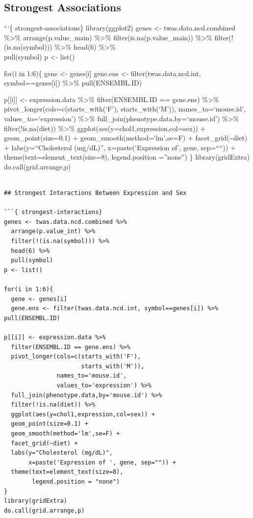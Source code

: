 \documentclass[
]{article}
\begin{document}
\hypertarget{strongest-associations}{%
\subsection{Strongest Associations}\label{strongest-associations}}

```\{ strongest-associations\} library(ggplot2) genes \textless-
twas.data.ncd.combined \%\textgreater\% arrange(p.value\_main)
\%\textgreater\% filter(is.na(p.value\_main)) \%\textgreater\%
filter(!(is.na(symbol))) \%\textgreater\% head(6) \%\textgreater\%\\
pull(symbol) p \textless- list()

for(i in 1:6)\{ gene \textless- genes{[}i{]} gene.ens \textless-
filter(twas.data.ncd.int, symbol==genes{[}i{]}) \%\textgreater\%
pull(ENSEMBL.ID)

p{[}{[}i{]}{]} \textless- expression.data \%\textgreater\%
filter(ENSEMBL.ID == gene.ens) \%\textgreater\%
pivot\_longer(cols=c(starts\_with(`F'), starts\_with(`M')),
names\_to=`mouse.id', values\_to=`expression') \%\textgreater\%
full\_join(phenotype.data,by=`mouse.id') \%\textgreater\%
filter(!is.na(diet)) \%\textgreater\%
ggplot(aes(y=chol1,expression,col=sex)) + geom\_point(size=0.1) +
geom\_smooth(method=`lm',se=F) + facet\_grid(\textasciitilde diet) +
labs(y=``Cholesterol (mg/dL)'', x=paste(`Expression of', gene,
sep=````)) + theme(text=element\_text(size=8), legend.position
=''none'') \} library(gridExtra) do.call(grid.arrange,p)

\begin{verbatim}

## Strongest Interactions Between Expression and Sex

```{ strongest-interactions}
genes <- twas.data.ncd.combined %>% 
  arrange(p.value_int) %>%
  filter(!(is.na(symbol))) %>% 
  head(6) %>%  
  pull(symbol)
p <- list()

for(i in 1:6){
  gene <- genes[i] 
  gene.ens <- filter(twas.data.ncd.int, symbol==genes[i]) %>% pull(ENSEMBL.ID)

p[[i]] <- expression.data %>%
  filter(ENSEMBL.ID == gene.ens) %>%
  pivot_longer(cols=c(starts_with('F'),
                      starts_with('M')),
               names_to='mouse.id',
               values_to='expression') %>%
  full_join(phenotype.data,by='mouse.id') %>%
  filter(!is.na(diet)) %>%
  ggplot(aes(y=chol1,expression,col=sex)) +
  geom_point(size=0.1) +
  geom_smooth(method='lm',se=F) +
  facet_grid(~diet) +
  labs(y="Cholesterol (mg/dL)",
       x=paste('Expression of ', gene, sep="")) +
  theme(text=element_text(size=8),
        legend.position = "none")
}
library(gridExtra)
do.call(grid.arrange,p)
\end{verbatim}
\end{document}
